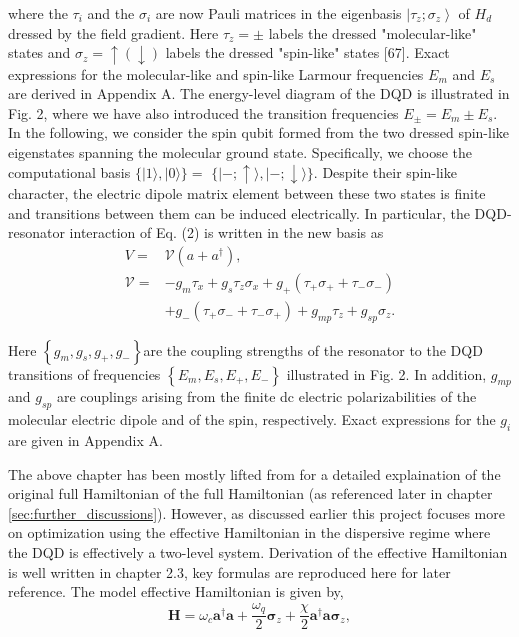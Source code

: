 \documentclass[12pt]{report}
\begin{document}
where the $\tau_i$ and the $\sigma_i$ are now Pauli matrices in the eigenbasis $\left|\tau_z ; \sigma_z\right\rangle$ of $H_d$ dressed by the field gradient. 
Here $\tau_z= \pm$ labels the dressed "molecular-like" states and $\sigma_z=\uparrow(\downarrow)$ labels the dressed "spin-like" states [67]. 
Exact expressions for the molecular-like and spin-like Larmour frequencies $E_m$ and $E_s$ are derived in \cite{D_Anjou_2019} Appendix A. The energy-level diagram of the DQD is illustrated in Fig. 2, where we have also introduced the transition frequencies $E_{ \pm}=E_m \pm E_s$. 
In the following, we consider the spin qubit formed from the two dressed spin-like eigenstates spanning the molecular ground state. 
Specifically, we choose the computational basis $\{|1\rangle,|0\rangle\}=$ $\{|-; \uparrow\rangle,|-; \downarrow\rangle\}$. 
Despite their spin-like character, the electric dipole matrix element between these two states is finite and transitions between them can be induced electrically. 
In particular, the DQD-resonator interaction of Eq. (2) is written in the new basis as
\begin{equation}\label{eq:DQD_resonator_interaction_new_basis}
    \begin{aligned}
        V= & \mathcal{V}\left(a+a^{\dagger}\right), \\
        \mathcal{V}= & -g_m \tau_x+g_s \tau_z \sigma_x+g_{+}\left(\tau_{+} \sigma_{+}+\tau_{-} \sigma_{-}\right) \\
        & +g_{-}\left(\tau_{+} \sigma_{-}+\tau_{-} \sigma_{+}\right)+g_{m p} \tau_z+g_{s p} \sigma_z .
        \end{aligned}    
\end{equation}

Here $\left\{g_m, g_s, g_{+}, g_{-}\right\}$are the coupling strengths of the resonator to the DQD transitions of frequencies $\left\{E_m, E_s, E_{+}, E_{-}\right\}$ illustrated in Fig. 2. 
In addition, $g_{m p}$ and $g_{s p}$ are couplings arising from the finite dc electric polarizabilities of the molecular electric dipole and of the spin, respectively. 
Exact expressions for the $g_i$ are given in \cite{D_Anjou_2019} Appendix A.
\par
The above chapter has been mostly lifted from \cite{D_Anjou_2019} for a detailed explaination of the original full Hamiltonian
of the full Hamiltonian (as referenced later in chapter \ref{sec:further_discussions}).
However, as discussed earlier this project focuses more on optimization using the effective Hamiltonian in the dispersive regime where the DQD is effectively a two-level system. 
Derivation of the effective Hamiltonian is well written in \cite{reinhold2019} chapter 2.3, key formulas are reproduced here for later reference. 
The model effective Hamiltonian is given by, 
\begin{equation}\label{eq:effective_Hamiltonian}
    \boldsymbol{H}=\omega_c \boldsymbol{a}^{\dagger} \boldsymbol{a}+\frac{\omega_q}{2} \boldsymbol{\sigma}_z+\frac{\chi}{2} \boldsymbol{a}^{\dagger} \boldsymbol{a} \boldsymbol{\sigma}_z,    
\end{equation}
\end{document}
